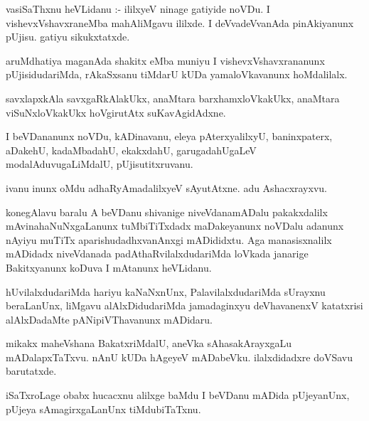 \documentclass{article}
\begin{document}
\begin{mn}
vasiSaThxnu  heVLidanu :- ililxyeV  ninage  gatiyide  noVDu.  I  vishevxVshavxraneMba  mahAliMgavu  
ililxde.  I  deVvadeVvanAda  pinAkiyanunx  pUjisu.  gatiyu  sikukxtatxde.
\end{mn}

\begin{mn}
aruMdhatiya  maganAda  shakitx  eMba  muniyu  I  vishevxVshavxrananunx  pUjisidudariMda,  rAkaSxsanu  
tiMdarU  kUDa  yamaloVkavanunx  hoMdalilalx.
\end{mn}

\begin{mn}
savxlapxkAla  savxgaRkAlakUkx,  anaMtara  barxhamxloVkakUkx,  anaMtara  viSuNxloVkakUkx  hoVgirutAtx  suKavAgidAdxne.  
\end{mn}

\begin{mn}
I  beVDananunx  noVDu,  kADinavanu,  eleya  pAterxyalilxyU,  baninxpaterx,  aDakehU,  kadaMbadahU,  
ekakxdahU,  garugadahUgaLeV  modalAduvugaLiMdalU,  pUjisutitxruvanu.	
\end{mn}

\begin{mn}
ivanu  inunx  oMdu  adhaRyAmadalilxyeV  sAyutAtxne.  adu  Ashacxrayxvu.
\end{mn}

\begin{mn}
konegAlavu  baralu  A  beVDanu  shivanige  niveVdanamADalu  pakakxdalilx  mAvinahaNuNxgaLanunx  
tuMbiTiTxdadx  maDakeyanunx  noVDalu  adanunx  nAyiyu  muTiTx  aparishudadhxvanAnxgi  mADididxtu.  
Aga  manasisxnalilx  mADidadx  niveVdanada  padAthaRvilalxdudariMda  loVkada  janarige  Bakitxyanunx  
koDuva  I  mAtanunx  heVLidanu.
\end{mn}

\begin{mn}
hUvilalxdudariMda  hariyu  kaNaNxnUnx,  PalavilalxdudariMda  sUrayxnu  beraLanUnx,  liMgavu  
alAlxDidudariMda  jamadaginxyu  deVhavanenxV  katatxrisi  alAlxDadaMte  pANipiVThavanunx  mADidaru.   
\end{mn}

\begin{mn}
mikakx  maheVshana  BakatxriMdalU,  aneVka  sAhasakArayxgaLu  mADalapxTaTxvu.  nAnU  kUDa  hAgeyeV  
mADabeVku.  ilalxdidadxre  doVSavu  barutatxde.
\end{mn}

\begin{mn}
iSaTxroLage  obabx  hucacxnu  alilxge  baMdu  I  beVDanu  mADida  pUjeyanUnx,  pUjeya  sAmagirxgaLanUnx  tiMdubiTaTxnu.  
\end{mn}
\end{document}
